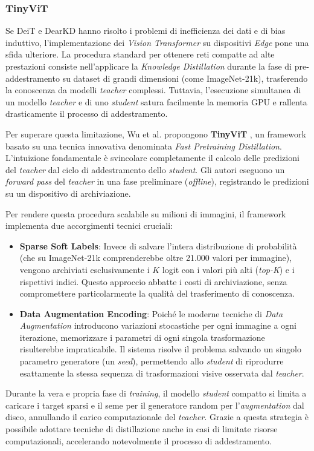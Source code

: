 \subsubsection{TinyViT}
Se DeiT e DearKD hanno risolto i problemi di inefficienza dei dati e di bias
induttivo, l'implementazione dei \textit{Vision Transformer} su dispositivi
\textit{Edge} pone una sfida ulteriore. La procedura standard per ottenere reti
compatte ad alte prestazioni consiste nell'applicare la \textit{Knowledge
    Distillation} durante la fase di pre-addestramento su dataset di grandi
dimensioni (come ImageNet-21k), trasferendo la conoscenza da modelli
\textit{teacher} complessi. Tuttavia, l'esecuzione simultanea di un modello
\textit{teacher} e di uno \textit{student} satura facilmente la memoria GPU e
rallenta drasticamente il processo di addestramento. \par
Per superare questa limitazione, Wu et al. propongono \textbf{TinyViT}
\cite{wu2022tinyvitfastpretrainingdistillation}, un framework basato su una
tecnica innovativa denominata \textit{Fast Pretraining Distillation}.
L'intuizione fondamentale è svincolare completamente il calcolo delle
predizioni del \textit{teacher} dal ciclo di addestramento dello
\textit{student}. Gli autori eseguono un \textit{forward pass} del
\textit{teacher} in una fase preliminare (\textit{offline}), registrando le
predizioni su un dispositivo di archiviazione. \par
Per rendere questa procedura scalabile su milioni di immagini, il framework
implementa due accorgimenti tecnici cruciali:
\begin{itemize}
    \item \textbf{Sparse Soft Labels}: Invece di salvare l'intera distribuzione di probabilità (che su ImageNet-21k comprenderebbe oltre 21.000 valori per immagine), vengono archiviati esclusivamente i $K$ logit con i valori più alti (\textit{top-K}) e i rispettivi indici. Questo approccio abbatte i costi di archiviazione, senza compromettere particolarmente la qualità del trasferimento di conoscenza.
    \item \textbf{Data Augmentation Encoding}: Poiché le moderne tecniche di \textit{Data Augmentation} introducono variazioni stocastiche per ogni immagine a ogni iterazione, memorizzare i parametri di ogni singola trasformazione risulterebbe impraticabile. Il sistema risolve il problema salvando un singolo parametro generatore (un \textit{seed}), permettendo allo \textit{student} di riprodurre esattamente la stessa sequenza di trasformazioni visive osservata dal \textit{teacher}.
\end{itemize}
Durante la vera e propria fase di \textit{training}, il modello \textit{student} compatto si limita a caricare i target sparsi e il seme per il generatore random per l'\textit{augmentation} dal disco, annullando il carico computazionale del \textit{teacher}. Grazie a questa strategia è possibile adottare tecniche di distillazione anche in casi di limitate risorse computazionali, accelerando notevolmente il processo di addestramento.
